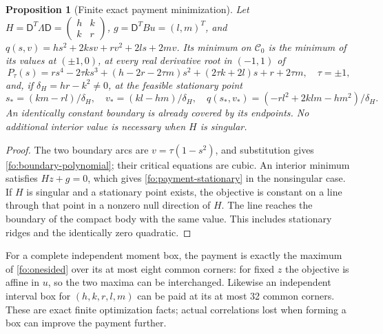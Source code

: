 \documentclass[11pt]{article}
\numberwithin{equation}{section}
\newtheorem{proposition}[theorem]{Proposition}
\theoremstyle{definition}
\theoremstyle{remark}
\begin{document}
\begin{proposition}[Finite exact payment minimization]
\label{fo:cubic-payment}
Let $H=\mathsf D^T\Lambda\mathsf D=\left(\begin{smallmatrix}h&k\\k&r\end{smallmatrix}\right)$,
$g=\mathsf D^TBu=(l,m)^T$, and
$q(s,v)=hs^2+2ksv+rv^2+2ls+2mv$.
Its minimum on $\mathcal C_0$ is the minimum of its values at
$(\pm1,0)$, at every real derivative root in $(-1,1)$ of
\begin{equation}
P_\tau(s)=rs^4-2\tau ks^3+(h-2r-2\tau m)s^2
                +(2\tau k+2l)s+r+2\tau m,
\quad \tau=\pm1,
\label{fo:boundary-polynomial}
\end{equation}
and, if $\delta_H=hr-k^2\ne0$, at the feasible stationary point
\begin{equation}
s_*=(km-rl)/\delta_H,\quad v_*=(kl-hm)/\delta_H,
\quad q(s_*,v_*)=(-rl^2+2klm-hm^2)/\delta_H.
\label{fo:payment-stationary}
\end{equation}
An identically constant boundary is already covered by its endpoints.
No additional interior value is necessary when $H$ is singular.
\end{proposition}
\begin{proof}
The two boundary arcs are $v=\tau(1-s^2)$, and substitution gives
\eqref{fo:boundary-polynomial}; their critical equations are cubic.
An interior minimum satisfies $Hz+g=0$, which gives
\eqref{fo:payment-stationary} in the nonsingular case.  If $H$ is
singular and a stationary point exists, the objective is constant on
a line through that point in a nonzero null direction of $H$.
The line reaches the boundary of the compact body with the same value.
This includes stationary ridges and the identically zero quadratic.
\end{proof}
For a complete independent moment box, the payment is exactly the
maximum of \eqref{fo:onesided} over its at most eight common corners:
for fixed $z$ the objective is affine in $u$, so the two maxima can be
interchanged.  Likewise an independent interval box for
$(h,k,r,l,m)$ can be paid at its at most 32 common corners.
These are exact finite optimization facts; actual correlations lost
when forming a box can improve the payment further.
\end{document}
